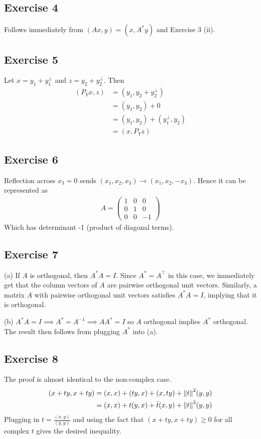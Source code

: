 \subsection{Exercise 4}
Follows immediately from $(Ax, y) = (x, A^{*}y)$ and Exercise 3 (ii).

\subsection{Exercise 5}
Let $x = y_1 + y_1^{\perp}$ and $z = y_2 + y_2^{\perp}$. Then
\begin{align*}
        (P_Y x, z) &= (y_1, y_2 + y_2^{\perp}) \\
                   &= (y_1, y_2) + 0 \\
                   &= (y_1, y_2) + (y_1^{\perp}, y_2) \\
                   &= (x, P_Y z)
\end{align*}

\subsection{Exercise 6}
Reflection across $x_3 = 0$ sends $(x_1, x_2, x_3) \to (x_1, x_2, -x_3)$. Hence it can be represented as
\begin{align*}
       A =
       \begin{pmatrix}
               1 & 0 & 0 \\
               0 & 1 & 0 \\
               0 & 0 & -1
       \end{pmatrix}
\end{align*}
Which has determinant -1 (product of diagonal terms).

\subsection{Exercise 7}
(a) If $A$ is orthogonal, then $A^{*}A = I$. Since $A^{*} = A^{\top}$ in this case, we immediately get
that the column vectors of $A$ are pairwise orthogonal unit vectors. Similarly, a matrix $A$ with
pairwise orthogonal unit vectors satisfies $A^{*} A = I$, implying that it is orthogonal.

(b) $A^{*} A = I \implies A^{*} = A^{-1} \implies A A^{*} = I$ so $A$ orthogonal implies $A^{*}$ orthogonal.
The result then follows from plugging $A^{*}$ into (a).

\subsection{Exercise 8}
The proof is almost identical to the non-complex case.
\begin{align*}
        (x + ty, x + ty) &= (x, x) + (ty, x) + (x, ty) + \norm{t}^2 (y, y) \\
                         &= (x, x) + t(y, x) + \bar{t}(x, y) + \norm{t}^2 (y, y)
\end{align*}
Plugging in $t = \frac{(x, y)}{(y, y)}$ and using the fact that $(x + ty, x + ty) \geq 0$ for all
complex $t$ gives the desired inequality.

